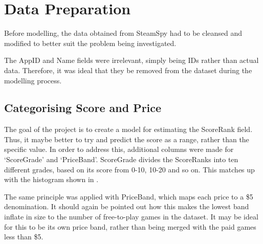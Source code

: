 \documentclass[preparation.tex]{subfiles}
\begin{document}
\section{Data Preparation} %
\label{sec:preparation}
Before modelling, the data obtained from SteamSpy had to be cleansed and
modified to better suit the problem being investigated.

The AppID and Name fields were irrelevant, simply being IDs rather than actual
data. Therefore, it was ideal that they be removed from the dataset during the
modelling process.

\subsection{Categorising Score and Price} %
\label{sub:categorising_score_price}
The goal of the project is to create a model for estimating the ScoreRank
field. Thus, it maybe better to try and predict the score as a range, rather
than the specific value. In order to address this, additional columns were made
for `ScoreGrade' and `PriceBand'. ScoreGrade divides the ScoreRanks into ten
different grades, based on its score from 0-10, 10-20 and so on. This matches
up with the histogram shown in .

The same principle was applied with PriceBand, which maps each price to a \$5
denomination. It should again be pointed out how this makes the lowest band
inflate in size to the number of free-to-play games in the dataset. It may be
ideal for this to be its own price band, rather than being merged with the paid
games less than \$5.
\end{document}
